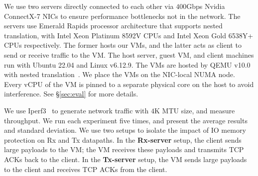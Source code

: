 We use two servers directly connected to each other via $400$Gbps Nvidia ConnectX-7 NICs to ensure performance bottlenecks not in the 
  network. 
The servers use Emerald Rapids processor architecture that supports nested translation,
  with Intel Xeon Platinum 8592V CPUs and Intel Xeon Gold 6538Y+ CPUs respectively. 
The former hosts our VMs, 
  and the latter acts as client to send or receive traffic to the VM. 
The host server, guest VM, and client machines run with Ubuntu 22.04 and Linux v6.12.9. 
The VMs are hosted by QEMU v10.0 with nested translation~\cite{yiliu1765qemu}.
We place the VMs on the NIC-local NUMA node.
Every vCPU of the VM is pinned to a separate physical core on the host to avoid interference. See \S\ref{sec:eval} for more details.

We use Iperf3~\cite{iperf3} to generate network traffic with $4$K MTU size, and measure throughput.
We run each experiment five times, and present the average results and standard deviation. We use two setups to isolate the impact of IO memory protection on Rx and Tx datapaths. In the {\bf Rx-server} setup, the client sends large payloads to the VM; the VM receives these payloads and transmits TCP ACKs back to the client. In the {\bf Tx-server} setup, the VM sends large payloads to the client and receives TCP ACKs from the client.




